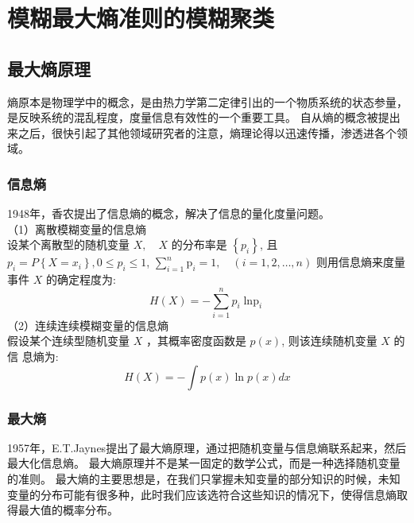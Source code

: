 \chapter[模糊最大熵准则的模糊聚类]{模糊最大熵准则的模糊聚类}
\section{最大熵原理}
熵原本是物理学中的概念，是由热力学第二定律引出的一个物质系统的状态参量，是反映系统的混乱程度，度量信息有效性的一个重要工具。
自从熵的概念被提出来之后，很快引起了其他领域研究者的注意，熵理论得以迅速传播，渗透进各个领域。
\subsection{信息熵}
1948年，香农\cite{1948A}提出了信息熵的概念，解决了信息的量化度量问题。\\
（1）离散模糊变量的信息熵\\
设某个离散型的随机变量 $X, \quad X$ 的分布率是 $\left\{p_{i}\right\}$, 且 $p_{i}=P\left\{X=x_{i}\right\}, 0 \leq p_{i} \leq 1$,
$\sum_{i=1}^n \mathrm{p}_i=1, \quad(i=1,2 ,\dots, n)$ 则用信息熵来度量事件 $X$ 的确定程度为:
\begin{equation}
    H(X) =-\sum_{i=1}^{n} p_{i} \operatorname{\ln p}_{i}
\end{equation}
（2）连续连续模糊变量的信息熵\\
假设某个连续型随机变量 $X$ ，其概率密度函数是 $p(x)$, 则该连续随机变量 $X$ 的信
息熵为:
\begin{equation}
    H(X)=-\int p(x) \ln p(x) d x
\end{equation}

\subsection{最大熵}
1957年，E.T.Jaynes提出了最大熵原理，通过把随机变量与信息熵联系起来，然后最大化信息熵。
最大熵原理并不是某一固定的数学公式，而是一种选择随机变量的准则。
最大熵的主要思想是，在我们只掌握未知变量的部分知识的时候，未知变量的分布可能有很多种，此时我们应该选符合这些知识的情况下，使得信息熵取得最大值的概率分布。

